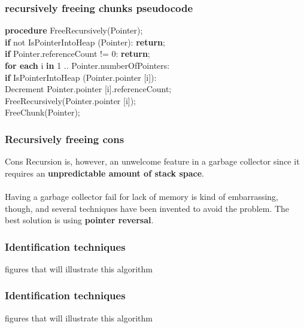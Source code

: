 \documentclass[presentation]{beamer}
\begin{document}
\begin{frame}
  \frametitle{recursively freeing chunks pseudocode}
  \justifying  
  \begin{block}{}
  \textbf{procedure} FreeRecursively(Pointer); \\
\hspace*{20pt} \textbf{if} not IsPointerIntoHeap (Pointer): \textbf{return};\\
\hspace*{20pt} \textbf{if} Pointer.referenceCount != 0: \textbf{return};\\
\hspace*{20pt} \textbf{for each} i \textbf{in} 1 .. Pointer.numberOfPointers: \\
\hspace*{40pt} \textbf{if} IsPointerIntoHeap (Pointer.pointer [i]): \\
\hspace*{60pt} Decrement Pointer.pointer [i].referenceCount; \\
\hspace*{60pt} FreeRecursively(Pointer.pointer [i]); \\
\hspace*{20pt} FreeChunk(Pointer); \\
  \end{block}
\end{frame}

\begin{frame}
  \frametitle{Recursively freeing cons} 
  \justifying
      \begin{alertblock}{Cons}
        Recursion is, however, an unwelcome feature in a garbage collector since it requires an \textbf{unpredictable amount of stack space}. 
\\~\\        
\justifying
        Having a garbage collector fail for lack of memory is kind of embarrassing, though, and several techniques
have been invented to avoid the problem. The best solution is using \textbf{pointer reversal}.
    \end{alertblock}
\end{frame}

\begin{frame}
  \frametitle{Identification techniques} 
  \justifying
  figures that will illustrate this algorithm
\end{frame}

\begin{frame}
  \frametitle{Identification techniques} 
  \justifying
  figures that will illustrate this algorithm
\end{frame}
\end{document}
